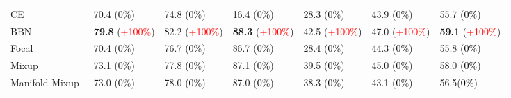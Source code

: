 \documentclass{article}
\begin{document}
\begin{table*}[t]
\begin{tabular}{lllllll}
CE  & 70.4 \scriptsize{(\textcolor{black}{0\%})} & 74.8 \scriptsize{(\textcolor{black}{0\%})} &  16.4 \scriptsize{(\textcolor{black}{0\%})} & 28.3 \scriptsize{(\textcolor{black}{0\%})} & 43.9 \scriptsize{(\textcolor{black}{0\%})} &  55.7 \scriptsize{(\textcolor{black}{0\%})} \\BBN\scriptsize{}~\cite{zhou2019bbn}  & \textbf{79.8} \scriptsize{(\textcolor{red}{+100\%})} & 82.2 \scriptsize{(\textcolor{red}{+100\%})} &  \textbf{88.3} \scriptsize{(\textcolor{red}{+100\%})} & 42.5 \scriptsize{(\textcolor{red}{+100\%})} & 47.0 \scriptsize{(\textcolor{red}{+100\%})} &  \textbf{59.1}  \scriptsize{(\textcolor{red}{+100\%})} \\Focal\scriptsize{}~\cite{lin2017focal}  & 70.4 \scriptsize{(\textcolor{black}{0\%})} & 76.7 \scriptsize{(\textcolor{black}{0\%})} &  86.7 \scriptsize{(\textcolor{black}{0\%})} & 28.4 \scriptsize{(\textcolor{black}{0\%})} & 44.3 \scriptsize{(\textcolor{black}{0\%})} &  55.8 \scriptsize{(\textcolor{black}{0\%})}\\Mixup\scriptsize{}~\cite{zhang2017mixup}  & 73.1 \scriptsize{(\textcolor{black}{0\%})} & 77.8 \scriptsize{(\textcolor{black}{0\%})} &  87.1 \scriptsize{(\textcolor{black}{0\%})} & 39.5 \scriptsize{(\textcolor{black}{0\%})} & 45.0 \scriptsize{(\textcolor{black}{0\%})} &  58.0 \scriptsize{(\textcolor{black}{0\%})}\\Manifold Mixup\scriptsize{}~\cite{verma2018manifold}  & 73.0 \scriptsize{(\textcolor{black}{0\%})}& 78.0 \scriptsize{(\textcolor{black}{0\%})}&  87.0 \scriptsize{(\textcolor{black}{0\%})}& 38.3 \scriptsize{(\textcolor{black}{0\%})}& 43.1 \scriptsize{(\textcolor{black}{0\%})}&  56.5\scriptsize{(\textcolor{black}{0\%})}\\


\end{tabular}
\end{table*}
\end{document}
